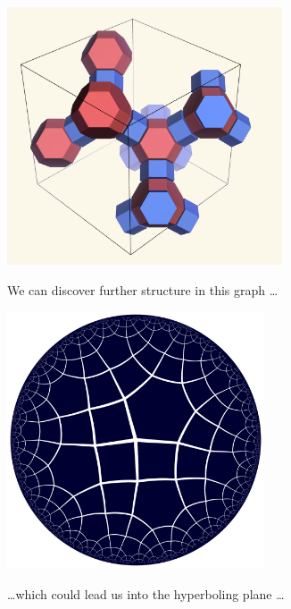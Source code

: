 \documentclass{beamer}
\begin{document}
\begin{frame}
  \begin{center}
    \includegraphics[height=3in]{fau-cages-new}

    We can discover further structure in this graph \dots
  \end{center}
\end{frame}

\begin{frame}
  \begin{center}
    \includegraphics[height=3in]{hqc0576}

    \dots which could lead us into the hyperboling plane \dots
  \end{center}
\end{frame}
\end{document}
